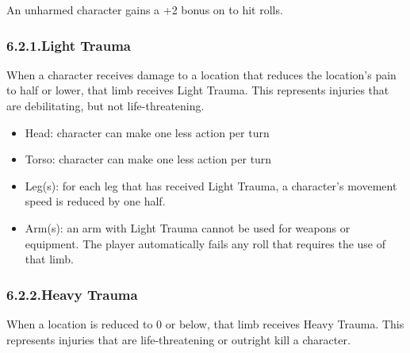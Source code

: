 \documentclass{article}
\begin{document}
An unharmed character gains a +2 bonus on to hit rolls.%

\subsubsection{6.2.1.\hspace*{0.5em}Light Trauma}\label{sec-light-trauma}%

\noindent{}When a character receives damage to a location that reduces the location’s pain to half or lower, that limb receives Light Trauma. This represents injuries that are debilitating, but not life-threatening.%

\begin{itemize}[noitemsep,topsep=\mdcompacttopsep]%

\item{}Head: character can make one less action per turn %

\item{}Torso: character can make one less action per turn %

\item{}Leg(s): for each leg that has received Light Trauma, a character’s movement speed is reduced by one half. %

\item{}Arm(s): an arm with Light Trauma cannot be used for weapons or equipment. The player automatically fails any roll that requires the use of that limb. %
\end{itemize}%

\subsubsection{6.2.2.\hspace*{0.5em}Heavy Trauma}\label{sec-heavy-trauma}%

\noindent{}When a location is reduced to 0 or below, that limb receives Heavy Trauma. This represents injuries that are life-threatening or outright kill a character.%
\end{document}
